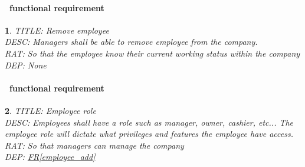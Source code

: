 \documentclass{scrreprt}
\theoremstyle{funreq}
\newtheorem{funreq}{}
\newcommand*{\reqref}[1]{\hyperref[#1]{FR\ref*{#1}}}
\begin{document}
\paragraph[]{\Subsectionname ~functional requirement }
\begin{funreq}
	\label{employee_remove}
	TITLE: Remove employee\\
	DESC: Managers shall be able to remove employee from the company.  \\
	RAT:  So that the employee know their current working status within the company\\
	DEP: None
\end{funreq}
	
	\paragraph[]{\Subsectionname ~functional requirement }
	\begin{funreq}
		\label{employee_role}
		TITLE: Employee role\\
		DESC: Employees shall have a role such as manager, owner, cashier, etc...  The employee role will dictate what privileges and features the employee have access.\\
		RAT:  So that managers can manage the company\\
		DEP: \reqref{employee_add}
	\end{funreq}

\end{document}
